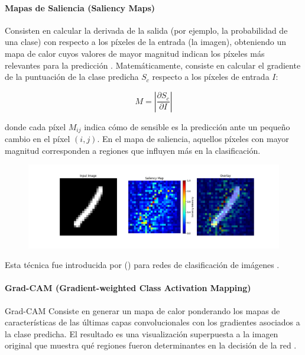 \paragraph{Mapas de Saliencia (Saliency Maps)}
Consisten en calcular la derivada de la salida (por ejemplo, la probabilidad de una clase) con respecto a los píxeles de la entrada (la imagen), obteniendo un mapa de calor cuyos valores de mayor magnitud indican los píxeles más relevantes para la predicción \cite{visualizing__simonyan__2014}. Matemáticamente, consiste en calcular el gradiente de la puntuación de la clase predicha $S_c$ respecto a los píxeles de entrada $I$:

\begin{equation}
	M = \left|\frac{\partial S_c}{\partial I}\right|
\end{equation}

donde cada píxel $M_{ij}$ indica cómo de sensible es la predicción ante un pequeño cambio en el píxel $(i,j)$. En el mapa de saliencia, aquellos píxeles con mayor magnitud corresponden a regiones que influyen más en la clasificación.

\begin{figure}[htb]
	\centering
	\includegraphics[width=1\linewidth]{figures/ejemplos/saliency_map.png}
	\label{fig:mapa_saliencia}
\end{figure}

Esta técnica fue introducida por \citeauthor{visualizing__simonyan__2014} (\citeyear{visualizing__simonyan__2014}) para redes de clasificación de imágenes \cite{visualizing__simonyan__2014}.

\paragraph{Grad-CAM (Gradient-weighted Class Activation Mapping)}
Grad-CAM Consiste en generar un mapa de calor ponderando los mapas de características de las últimas capas convolucionales con los gradientes asociados a la clase predicha. El resultado es una visualización superpuesta a la imagen original que muestra qué regiones fueron determinantes en la decisión de la red \cite{Selvaraju17-gradcam}.

